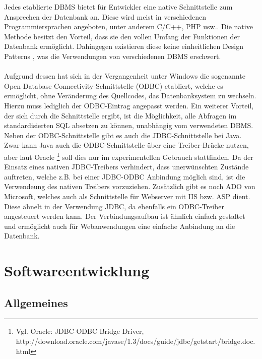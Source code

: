 Jedes etablierte DBMS bietet für Entwickler eine native Schnittstelle zum Ansprechen der Datenbank an.
Diese wird meist in verschiedenen Programmiersprachen angeboten, unter anderem C/C++, PHP usw..
Die native Methode besitzt den Vorteil, dass sie den vollen Umfang der Funktionen der Datenbank ermöglicht. Dahingegen existieren diese keine einheitlichen Design Patterns , was die Verwendungen von verschiedenen DBMS erschwert.\\\\
Aufgrund dessen hat sich in der Vergangenheit unter Windows die sogenannte Open Database Connectivity-Schnittstelle (ODBC) etabliert, welche es ermöglicht, ohne Veränderung des Quellcodes, das Datenbanksystem zu wechseln.
Hierzu muss lediglich der ODBC-Eintrag angepasst werden.
Ein weiterer Vorteil, der sich durch die Schnittstelle ergibt, ist die Möglichkeit, alle Abfragen im standardisierten SQL absetzen zu können, unabhängig vom verwendeten DBMS.
Neben der ODBC-Schnittstelle gibt es auch die JDBC-Schnittstelle bei Java.
Zwar kann Java auch die ODBC-Schnittstelle über eine Treiber-Brücke nutzen, aber laut Oracle \footnote{Vgl. Oracle: JDBC-ODBC Bridge Driver, http://download.oracle.com/javase/1.3/docs/guide/jdbc/getstart/bridge.doc.html} soll dies nur im experimentellen Gebrauch stattfinden.
Da der Einsatz eines nativen JDBC-Treibers verhindert, dass unerwünschten Zustände auftreten, welche z.B. bei einer JDBC-ODBC Anbindung möglich sind, ist die Verwendeung des nativen Treibers vorzuziehen.
Zusätzlich gibt es noch ADO von Microsoft, welches auch als Schnittstelle für Webserver mit IIS bzw. ASP dient.
Diese ähnelt in der Verwendung JDBC, da ebenfalls ein ODBC-Treiber angesteuert werden kann.
Der Verbindungsaufbau ist ähnlich einfach gestaltet und ermöglicht auch für Webanwendungen eine einfache Anbindung an die Datenbank.

\section{Softwareentwicklung}
\label{sec:softdev}

\subsection{Allgemeines}

